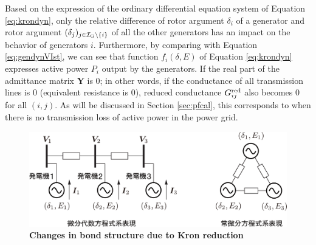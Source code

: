 \documentclass[graybox, envcountchap]{svmult}
\begin{document}
%

Based on the expression of the ordinary differential equation system of Equation \ref{eq:krondyn}, only the relative difference of rotor argument $\delta_i$ of a generator and rotor argument $(\delta_j)_{j\in \mathcal{I}_{\rm G}\setminus \{i\}} $ of all the other generators has an impact on the behavior of generators $i$.
Furthermore, by comparing with Equation \ref{eq:gendynVIst}, we can see that function $f_i(\delta,E)$ of Equation \ref{eq:krondyn} expresses active power $P_i$ output by the generators.
If the real part of the admittance matrix $\bm{Y}$ is 0; in other words, if the conductance of all transmission lines is 0 (equivalent resistance is 0), reduced conductance $G_{ij}^{\rm red} $ also becomes 0 for all $(i,j)$.
As will be discussed in Section \ref{sec:pfcal}, this corresponds to when there is no transmission loss of active power in the power grid.


\begin{figure}[t]
\centering
\includegraphics[width = .85\linewidth]{figs/kronredgen}
\medskip
\caption{\textbf{Changes in bond structure due to Kron reduction}}
\label{fig:krongen}
\medskip
\end{figure}
\end{document}

